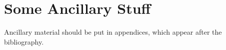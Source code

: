 \chapter{Some Ancillary Stuff}

Ancillary material should be put in appendices, which appear after the
bibliography. 
